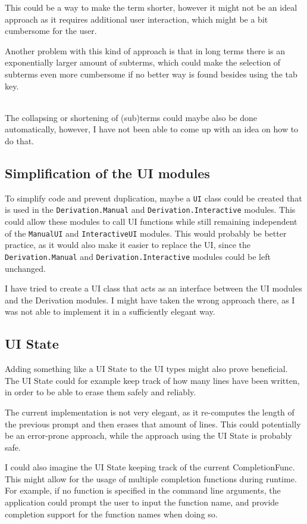 This could be a way to make the term shorter,
however it might not be an ideal approach as it requires additional user interaction,
which might be a bit cumbersome for the user.

Another problem with this kind of approach is that in long terms there is an exponentially larger amount of subterms,
which could make the selection of subterms even more cumbersome if no better way is found besides using the tab key.

\ \\
The collapsing or shortening of (sub)terms could maybe also be done automatically,
however,
I have not been able to come up with an idea on how to do that.

\subsection{Simplification of the UI modules}
\label{subsect:UIInterface}
To simplify code and prevent duplication,
maybe a \texttt{UI} class could be created that is used in the \texttt{Derivation.Manual} and \texttt{Derivation.Interactive} modules.
This could allow these modules to call UI functions while still remaining independent of the \texttt{ManualUI} and \texttt{InteractiveUI} modules.
This would probably be better practice,
as it would also make it easier to replace the UI,
since the \texttt{Derivation.Manual} and \texttt{Derivation.Interactive} modules could be left unchanged.

I have tried to create a UI class that acts as an interface between the UI modules and the Derivation modules.
I might have taken the wrong approach there,
as I was not able to implement it in a sufficiently elegant way.

\subsection{UI State}
\label{subsect:UIState}
Adding something like a UI State to the UI types might also prove beneficial.
The UI State could for example keep track of how many lines have been written,
in order to be able to erase them safely and reliably.

The current implementation is not very elegant,
as it re-computes the length of the previous prompt and then erases that amount of lines.
This could potentially be an error-prone approach,
while the approach using the UI State is probably safe.

I could also imagine the UI State keeping track of the current CompletionFunc.
This might allow for the usage of multiple completion functions during runtime.
For example, if no function is specified in the command line arguments,
the application could prompt the user to input the function name,
and provide completion support for the function names when doing so.

